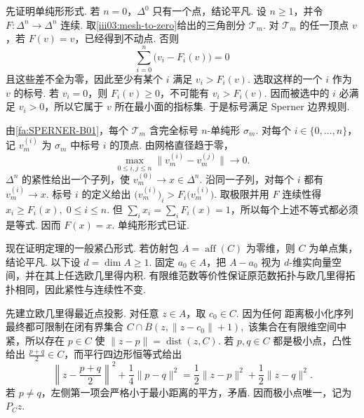 \begin{FAProof}
先证明单纯形形式. 若 \(\displaystyle n=0\)，\(\displaystyle \Delta^0\) 只有一个点，结论平凡. 设 \(\displaystyle n\geqslant1\)，并令 \(\displaystyle F:\Delta^n\to\Delta^n\) 连续. 取\autoref{iii03:mesh-to-zero}给出的三角剖分 \(\displaystyle \mathcal T_m\). 对 \(\displaystyle \mathcal T_m\) 的任一顶点 \(\displaystyle v\)，若 \(\displaystyle F(v)=v\)，已经得到不动点. 否则
\[
\sum_{i=0}^{n}\bigl(v_i-F_i(v)\bigr)=0
\]
且这些差不全为零，因此至少有某个 \(\displaystyle i\) 满足 \(\displaystyle v_i>F_i(v)\). 选取这样的一个 \(\displaystyle i\) 作为 \(\displaystyle v\) 的标号. 若 \(\displaystyle v_i=0\)，则 \(\displaystyle F_i(v)\geqslant0\)，不可能有 \(\displaystyle v_i>F_i(v)\). 因而被选中的 \(\displaystyle i\) 必满足 \(\displaystyle v_i>0\)，所以它属于 \(\displaystyle v\) 所在最小面的指标集. 于是标号满足 Sperner 边界规则.

由\autoref{fa:SPERNER-B01}，每个 \(\displaystyle \mathcal T_m\) 含完全标号 \(\displaystyle n\)-单纯形 \(\displaystyle \sigma_m\). 对每个 \(\displaystyle i\in\{0,\dots,n\}\)，记 \(\displaystyle v_m^{(i)}\) 为 \(\displaystyle \sigma_m\) 中标号 \(\displaystyle i\) 的顶点. 由网格直径趋于零，
\[
\max_{0\leqslant i,j\leqslant n}\|v_m^{(i)}-v_m^{(j)}\|
\longrightarrow0.
\]
\(\displaystyle \Delta^n\) 的紧性给出一个子列，使 \(\displaystyle v_m^{(0)}\to x\in\Delta^n\). 沿同一子列，对每个 \(\displaystyle i\) 都有 \(\displaystyle v_m^{(i)}\to x\). 标号 \(\displaystyle i\) 的定义给出
\(\displaystyle \bigl(v_m^{(i)}\bigr)_i > F_i\bigl(v_m^{(i)}\bigr).\)
取极限并用 \(\displaystyle F\) 连续性得
\(\displaystyle x_i\geqslant F_i(x), \; 0\leqslant i\leqslant n.\)
但 \(\displaystyle \sum_i x_i=\sum_iF_i(x)=1\)，所以每个上述不等式都必须是等式. 因而 \(\displaystyle F(x)=x\). 单纯形形式已证.

现在证明定理的一般紧凸形式. 若仿射包 \(\displaystyle A=\operatorname{aff}(C)\) 为零维，则 \(\displaystyle C\) 为单点集，结论平凡. 以下设 \(\displaystyle d=\dim A\geqslant1\). 固定 \(\displaystyle a_0\in A\)，把 \(\displaystyle A-a_0\) 视为 \(\displaystyle d\)-维实向量空间，并在其上任选欧几里得内积. 有限维范数等价性保证原范数拓扑与欧几里得拓扑相同，因此紧性与连续性不变.

先建立欧几里得最近点投影. 对任意 \(\displaystyle z\in A\)，取 \(\displaystyle c_0\in C\). 因为任何 距离极小化序列最终都可限制在闭有界集合
\(\displaystyle C\cap\overline B(z,\|z-c_0\|+1),\)
该集合在有限维空间中紧，所以存在 \(\displaystyle p\in C\) 使 \(\displaystyle \|z-p\|=\operatorname{dist}(z,C)\). 若 \(\displaystyle p,q\in C\) 都是极小点，凸性给出 \(\displaystyle \frac{p+q}{2}\in C\)，而平行四边形恒等式给出
\[
\left\|z-\frac{p+q}{2}\right\|^2
+
\frac{1}{4}\|p-q\|^2
=
\frac{1}{2}\|z-p\|^2+
\frac{1}{2}\|z-q\|^2.
\]
若 \(\displaystyle p\neq q\)，左侧第一项会严格小于最小距离的平方，矛盾. 因而极小点唯一，记为 \(\displaystyle P_Cz\).


\end{FAProof}
